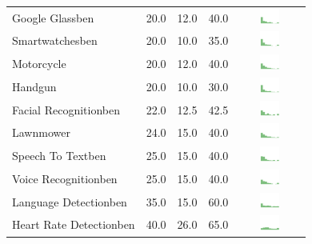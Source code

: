 \begin{table}[t]
\begin{center}
\begin{tabular}{| p{2cm} | p{1cm} | p{1cm} | p{1cm} | c |}
Google Glassben & 20.0 & 12.0 & 40.0 & \includegraphics[width = 2cm, height = 0.5cm]{tables/googleglassben} \\ 
Smartwatchesben & 20.0 & 10.0 & 35.0 & \includegraphics[width = 2cm, height = 0.5cm]{tables/smartwatchesben} \\ 
Motorcycle & 20.0 & 12.0 & 40.0 & \includegraphics[width = 2cm, height = 0.5cm]{tables/MotorcycleBenefit} \\ 
Handgun & 20.0 & 10.0 & 30.0 & \includegraphics[width = 2cm, height = 0.5cm]{tables/HandgunBenefit} \\ 
Facial Recognitionben & 22.0 & 12.5 & 42.5 & \includegraphics[width = 2cm, height = 0.5cm]{tables/facialrecognitionben} \\ 
Lawnmower & 24.0 & 15.0 & 40.0 & \includegraphics[width = 2cm, height = 0.5cm]{tables/LawnmowerBenefit} \\ 
Speech To Textben & 25.0 & 15.0 & 40.0 & \includegraphics[width = 2cm, height = 0.5cm]{tables/speechtotextben} \\ 
Voice Recognitionben & 25.0 & 15.0 & 40.0 & \includegraphics[width = 2cm, height = 0.5cm]{tables/voicerecognitionben} \\ 
Language Detectionben & 35.0 & 15.0 & 60.0 & \includegraphics[width = 2cm, height = 0.5cm]{tables/languagedetectionben} \\ 
Heart Rate Detectionben & 40.0 & 26.0 & 65.0 & \includegraphics[width = 2cm, height = 0.5cm]{tables/heartratedetectionben} \\ 

\end{tabular}
\end{center}
\end{table}
